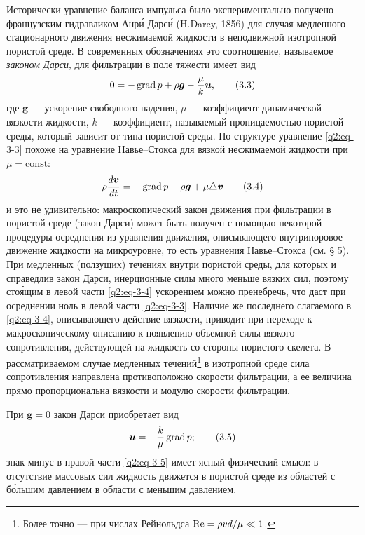 Исторически уравнение баланса импульса было экспериментально получено французским гидравликом Анр\'и Дарс\'и (H.Darcy, 1856) для случая медленного стационарного движения несжимаемой жидкости в неподвижной изотропной пористой
среде. В современных обозначениях это соотношение, называемое \textit{законом Дарси}, для фильтрации в поле тяжести имеет вид
\begin{equation}
0=-\operatorname{grad} p+\rho\boldsymbol{g}-\frac{\mu}{k}\boldsymbol{u},
\tag{3.3}\label{q2:eq-3-3}
\end{equation}
где $\boldsymbol{g}$ --- ускорение свободного падения, $\mu$ --- коэффициент динамической вязкости жидкости, $k$ --- коэффициент, называемый проницаемостью пористой среды, который зависит от типа пористой среды. По структуре уравнение \eqref{q2:eq-3-3} похоже на уравнение Навье--Стокса для вязкой несжимаемой жидкости при $\mu=\mathrm{const}$:
\begin{equation}
\rho\frac{d\boldsymbol{v}}{dt}=-\operatorname{grad} p+\rho\boldsymbol{g}+\mu\triangle\boldsymbol{v}
\tag{3.4}\label{q2:eq-3-4}
\end{equation}
и это не удивительно: макроскопический закон движения при фильтрации в пористой среде (закон Дарси) может быть получен с помощью некоторой процедуры осреднения из уравнения движения, описывающего внутрипоровое движение жидкости на микроуровне, то есть уравнения Навье--Стокса (см. § 5). При медленных (ползущих) течениях внутри пористой среды, для которых и справедлив закон Дарси, инерционные силы много меньше вязких сил, поэтому сто\'ящим в левой части \eqref{q2:eq-3-4} ускорением можно пренебречь, что даст при осреднении ноль в левой части \eqref{q2:eq-3-3}. Наличие же последнего слагаемого в \eqref{q2:eq-3-4}, описывающего действие вязкости, приводит при переходе к макроскопическому описанию к появлению объемной силы вязкого сопротивления, действующей на жидкость со стороны пористого скелета. В рассматриваемом случае медленных течений\setcounter{footnote}{0}\footnote{Более точно --- при числах Рейнольдса $\mathrm{Re}=\rho vd/\mu\ll1$.} в изотропной среде сила сопротивления направлена противоположно скорости фильтрации, а ее величина прямо пропорциональна вязкости и модулю скорости фильтрации.

При $\boldsymbol{g}=0$ закон Дарси приобретает вид
\begin{equation}
\boldsymbol{u}=-\frac{k}{\mu}\operatorname{grad} p;
\tag{3.5}\label{q2:eq-3-5}
\end{equation}
знак минус в правой части \eqref{q2:eq-3-5} имеет ясный физический смысл: в отсутствие массовых сил жидкость движется в пористой среде из областей с б\'ольшим давлением в области с меньшим давлением.

